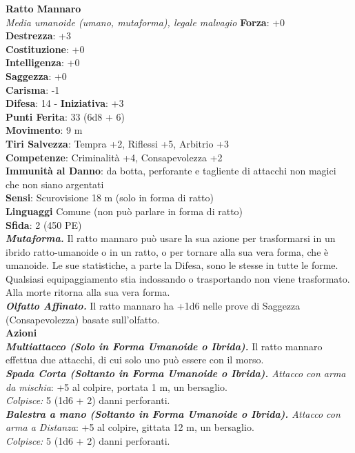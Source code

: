 \begin{multicols}{2}
\medskip\textbf{Ratto Mannaro}\\
\emph{Media umanoide (umano, mutaforma), legale malvagio}
\textbf{Forza}: +0\\
\textbf{Destrezza}: +3\\
\textbf{Costituzione}: +0\\
\textbf{Intelligenza}: +0\\
\textbf{Saggezza}: +0\\
\textbf{Carisma}: -1\\
\textbf{Difesa}: 14 - \textbf{Iniziativa}: +3\\
\textbf{Punti Ferita}: 33 (6d8 + 6)\\
\textbf{Movimento}: 9 m\\
\textbf{Tiri Salvezza}: Tempra +2, Riflessi +5, Arbitrio +3\\
\textbf{Competenze}: Criminalità +4, Consapevolezza +2\\
\textbf{Immunità al Danno}: da botta, perforante e tagliente di attacchi non magici che non siano argentati\\
\textbf{Sensi}: Scurovisione 18 m (solo in forma di ratto)\\
\textbf{Linguaggi} Comune (non può parlare in forma di ratto)\\
\textbf{Sfida}: 2 (450 PE)\smallskip\\
\emph{\textbf{Mutaforma.}} Il ratto mannaro può usare la sua azione per trasformarsi in un ibrido ratto-umanoide o in un ratto, o per tornare alla sua vera forma, che è umanoide. Le sue statistiche, a parte la Difesa, sono le stesse in tutte le forme. Qualsiasi equipaggiamento stia indossando o trasportando non viene trasformato. Alla morte ritorna alla sua vera forma.\\
\emph{\textbf{Olfatto Affinato.}} Il ratto mannaro ha +1d6 nelle prove di Saggezza (Consapevolezza) basate sull'olfatto.\\
\smallskip\textbf{Azioni}\\

\emph{\textbf{Multiattacco (Solo in Forma Umanoide o Ibrida).}} Il ratto mannaro effettua due attacchi, di cui solo uno può essere con il morso.\\
\emph{\textbf{Spada Corta (Soltanto in Forma Umanoide o Ibrida).} Attacco con arma da mischia}: +5 al colpire, portata 1 m, un bersaglio.\\
\emph{Colpisce:} 5 (1d6 + 2) danni perforanti.\\

\emph{\textbf{Balestra a mano (Soltanto in Forma Umanoide o Ibrida).} Attacco con arma a Distanza}: +5 al colpire, gittata 12 m, un bersaglio.\\
\emph{Colpisce:} 5 (1d6 + 2) danni perforanti.\\


\end{multicols}
